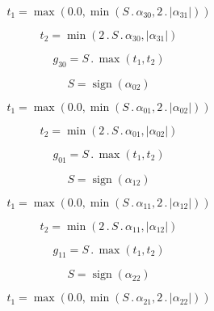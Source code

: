 \documentclass{article}
\begin{document}
\begin{dmath}t_{1} = \max\left(0.0, \min\left(S \,.\, \alpha_{30}, 2 \,.\, \left|{\alpha_{31}}\right|\right)\right)\end{dmath}

\begin{dmath}t_{2} = \min\left(2 \,.\, S \,.\, \alpha_{30}, \left|{\alpha_{31}}\right|\right)\end{dmath}

\begin{dmath}g_{30} = S \,.\, \max\left(t_{1}, t_{2}\right)\end{dmath}

\begin{dmath}S = \operatorname{sign}{\left (\alpha_{02} \right )}\end{dmath}

\begin{dmath}t_{1} = \max\left(0.0, \min\left(S \,.\, \alpha_{01}, 2 \,.\, \left|{\alpha_{02}}\right|\right)\right)\end{dmath}

\begin{dmath}t_{2} = \min\left(2 \,.\, S \,.\, \alpha_{01}, \left|{\alpha_{02}}\right|\right)\end{dmath}

\begin{dmath}g_{01} = S \,.\, \max\left(t_{1}, t_{2}\right)\end{dmath}

\begin{dmath}S = \operatorname{sign}{\left (\alpha_{12} \right )}\end{dmath}

\begin{dmath}t_{1} = \max\left(0.0, \min\left(S \,.\, \alpha_{11}, 2 \,.\, \left|{\alpha_{12}}\right|\right)\right)\end{dmath}

\begin{dmath}t_{2} = \min\left(2 \,.\, S \,.\, \alpha_{11}, \left|{\alpha_{12}}\right|\right)\end{dmath}

\begin{dmath}g_{11} = S \,.\, \max\left(t_{1}, t_{2}\right)\end{dmath}

\begin{dmath}S = \operatorname{sign}{\left (\alpha_{22} \right )}\end{dmath}

\begin{dmath}t_{1} = \max\left(0.0, \min\left(S \,.\, \alpha_{21}, 2 \,.\, \left|{\alpha_{22}}\right|\right)\right)\end{dmath}
\end{document}

